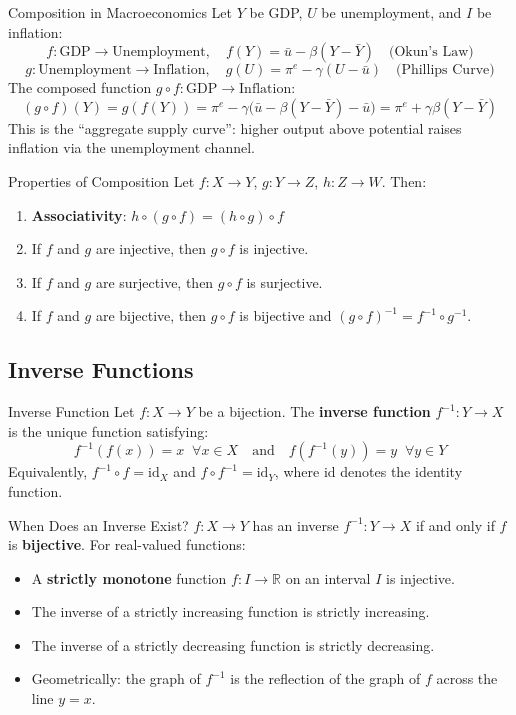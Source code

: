 \documentclass[12pt, a4paper]{article}
\theoremstyle{definition}
\newcommand{\R}{\mathbb{R}}
\begin{document}
\begin{exbox}{Composition in Macroeconomics}
Let $Y$ be GDP, $U$ be unemployment, and $I$ be inflation:
\[
  f: \text{GDP} \to \text{Unemployment},\quad f(Y) = \bar{u} - \beta(Y - \bar{Y}) \quad \text{(Okun's Law)}
\]
\[
  g: \text{Unemployment} \to \text{Inflation},\quad g(U) = \pi^e - \gamma(U - \bar{u}) \quad \text{(Phillips Curve)}
\]
The composed function $g \circ f: \text{GDP} \to \text{Inflation}$:
\[
  (g \circ f)(Y) = g(f(Y)) = \pi^e - \gamma\bigl(\bar{u} - \beta(Y-\bar{Y}) - \bar{u}\bigr) = \pi^e + \gamma\beta(Y - \bar{Y})
\]
This is the ``aggregate supply curve'': higher output above potential raises inflation via the unemployment channel.
\end{exbox}

\begin{thmbox}{Properties of Composition}
Let $f: X\to Y$, $g: Y\to Z$, $h: Z\to W$. Then:
\begin{enumerate}
  \item \textbf{Associativity}: $h\circ(g\circ f) = (h\circ g)\circ f$
  \item If $f$ and $g$ are injective, then $g\circ f$ is injective.
  \item If $f$ and $g$ are surjective, then $g\circ f$ is surjective.
  \item If $f$ and $g$ are bijective, then $g\circ f$ is bijective and $(g\circ f)^{-1} = f^{-1}\circ g^{-1}$.
\end{enumerate}
\end{thmbox}

\subsection{Inverse Functions}

\begin{defbox}{Inverse Function}
Let $f: X \to Y$ be a bijection. The \textbf{inverse function} $f^{-1}: Y \to X$ is the unique function satisfying:
\[
  f^{-1}(f(x)) = x \;\;\forall x \in X \quad \text{and} \quad f(f^{-1}(y)) = y \;\;\forall y \in Y
\]
Equivalently, $f^{-1} \circ f = \mathrm{id}_X$ and $f \circ f^{-1} = \mathrm{id}_Y$, where $\mathrm{id}$ denotes the identity function.
\end{defbox}

\begin{keybox}{When Does an Inverse Exist?}
$f: X \to Y$ has an inverse $f^{-1}: Y \to X$ if and only if $f$ is \textbf{bijective}. For real-valued functions:
\begin{itemize}
  \item A \textbf{strictly monotone} function $f: I \to \R$ on an interval $I$ is injective.
  \item The inverse of a strictly increasing function is strictly increasing.
  \item The inverse of a strictly decreasing function is strictly decreasing.
  \item Geometrically: the graph of $f^{-1}$ is the reflection of the graph of $f$ across the line $y = x$.
\end{itemize}
\end{keybox}
\end{document}
